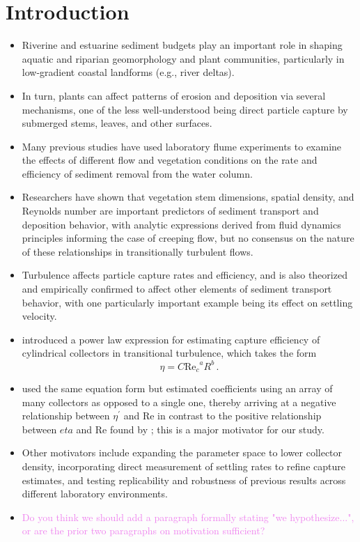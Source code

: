 \documentclass{article}
\newcommand\Rey{\mathrm{Re}}
\begin{document}
\section{Introduction}

\begin{itemize}
    \item Riverine and estuarine sediment budgets play an important role in shaping aquatic and riparian geomorphology and plant communities, particularly in low-gradient coastal landforms (e.g., river deltas).
    \item In turn, plants can affect patterns of erosion and deposition via several mechanisms, one of the less well-understood being direct particle capture by submerged stems, leaves, and other surfaces. 
    \item Many previous studies have used laboratory flume experiments to examine the effects of different flow and vegetation conditions on the rate and efficiency of sediment removal from the water column.
    \item Researchers have shown that vegetation stem dimensions, spatial density, and Reynolds number are important predictors of sediment transport and deposition behavior, with analytic expressions derived from fluid dynamics principles informing the case of creeping flow, but no consensus on the nature of these relationships in transitionally turbulent flows. 
    \item Turbulence affects particle capture rates and efficiency, and is also theorized and empirically confirmed to affect other elements of sediment transport behavior, with one particularly important example being its effect on settling velocity.
    \item \cite{Palmer_2004} introduced a power law expression for estimating capture efficiency of cylindrical collectors in transitional turbulence, which takes the form 
        \begin{equation}
            \eta=C{\Rey_c}^{a}R^{b}\,.
            \label{eq:powerlaw}
        \end{equation}
    \item \cite{Fauria_2015} used the same equation form but estimated coefficients using an array of many collectors as opposed to a single one, thereby arriving at a negative relationship between $\eta^\prime$ and $\Rey$ in contrast to the positive relationship between $eta$ and $\Rey$ found by \cite{Palmer_2004}; this is a major motivator for our study. 
    \item Other motivators include expanding the parameter space to lower collector density, incorporating direct measurement of settling rates to refine capture estimates, and testing replicability and robustness of previous results across different laboratory environments.
    \item \textcolor{violet}{Do you think we should add a paragraph formally stating "we hypothesize...", or are the prior two paragraphs on motivation sufficient?}
\end{itemize}
\end{document}
